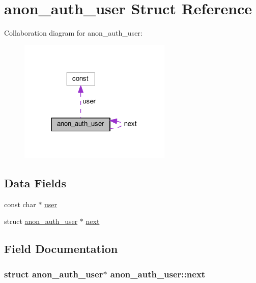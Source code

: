 \hypertarget{structanon__auth__user}{}\section{anon\+\_\+auth\+\_\+user Struct Reference}
\label{structanon__auth__user}


Collaboration diagram for anon\+\_\+auth\+\_\+user\+:
\nopagebreak
\begin{figure}[H]
\begin{center}
\leavevmode
\includegraphics[width=206pt]{structanon__auth__user__coll__graph}
\end{center}
\end{figure}
\subsection*{Data Fields}
\begin{DoxyCompactItemize}
\item 
const char $\ast$ \hyperlink{structanon__auth__user_a3687e328431193fe0701293d1d994454}{user}
\item 
struct \hyperlink{structanon__auth__user}{anon\+\_\+auth\+\_\+user} $\ast$ \hyperlink{structanon__auth__user_aedff020be9f9b2ec6aad207e35f9833a}{next}
\end{DoxyCompactItemize}


\subsection{Field Documentation}
\subsubsection[{\texorpdfstring{next}{next}}]{\setlength{\rightskip}{0pt plus 5cm}struct {\bf anon\+\_\+auth\+\_\+user}$\ast$ anon\+\_\+auth\+\_\+user\+::next}\hypertarget{structanon__auth__user_aedff020be9f9b2ec6aad207e35f9833a}{}\label{structanon__auth__user_aedff020be9f9b2ec6aad207e35f9833a}
